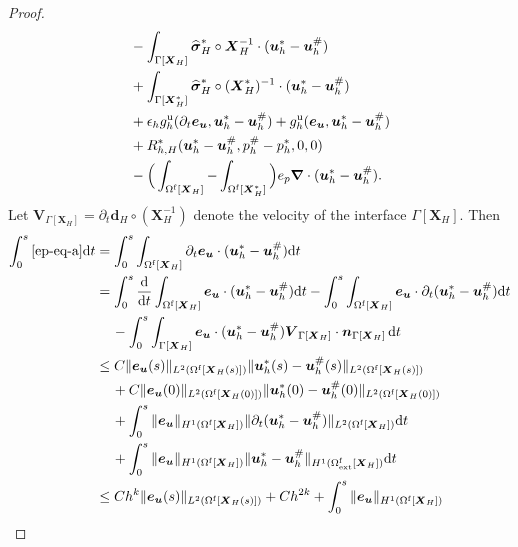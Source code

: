 \documentclass[11pt,reqno]{amsart}
\theoremstyle{definition}
\theoremstyle{plain}
\numberwithin{theorem}{section}
\numberwithin{proposition}{section}
\numberwithin{lemma}{section}
\numberwithin{equation}{section}
\newcommand{\bs}[1]{\boldsymbol{#1}}
\newcommand{\uu}[1]  {{\bs{#1}} }
\newcommand{\grad}   { \uu{\nabla}    }
\def\d{\mathrm{d}}
\renewcommand{\(}{\bigl(}
\renewcommand{\)}{\bigr)}
\begin{document}
\begin{proof}
\begin{subequations}
\begin{align}
& - \int_{\Gamma[\bs X_H]} {\widehat{\bs\sigma}}_H^*\circ {\bs X}_H^{-1}\cdot ({\bs u}_h^*-{\bs u}_h^\#)
\label{ep-eq-j}\\
& + \int_{\Gamma[\bs X_H^*]} {\widehat{\bs\sigma}}_H^*\circ({\bs X}_H^*)^{-1} \cdot ({\bs u}_h^*-{\bs u}_h^\#)  
\label{ep-eq-k}\\
& + \epsilon_h g_h^{\rm u} (\partial_t{\bs e}_{\bs u},{\bs u}_h^*-{\bs u}_h^\# )  + g_h^{\rm u} ({\bs e}_{\bs u},{\bs u}_h^*-{\bs u}_h^\# ) \label{ep-eq-l}\\
& + R_{h,H}^*( {\bs u}_h^*-{\bs u}_h^\# , p_h^\#- p_h^*, 0, 0)  \label{ep-eq-m}\\
& - \Big( \int_{\Omega^{\rm f}[\bs X_H]} - \int_{\Omega^{\rm f}[\bs X_H^*]} \Big) e_p \grad\cdot({\bs u}_h^*-{\bs u}_h^\#) . 
\label{ep-eq-n}
\end{align}
\end{subequations}
Let ${\bs V}_{\Gamma[\bs X_H]}=\partial_t{\bs d}_H\circ({\bs X}_H^{-1})$ denote the velocity of the interface $\Gamma[\bs X_H]$. Then 
\begin{align*}
\int_0^s \eqref{ep-eq-a} \d t
&= \int_0^s \int_{\Omega^{\rm f}[\bs X_H]} \partial_t {\bs e}_{\bs u} \cdot ({\bs u}_h^*-{\bs u}_h^\#) \d t \\
&= \int_0^s \frac{\d}{\d t}\int_{\Omega^{\rm f}[\bs X_H]}{\bs e}_{\bs u} \cdot ({\bs u}_h^*-{\bs u}_h^\#) \d t 
- \int_0^s \int_{\Omega^{\rm f}[\bs X_H]}{\bs e}_{\bs u} \cdot \partial_t({\bs u}_h^*-{\bs u}_h^\#) \d t \notag\\
&\quad\, 
- \int_0^s \int_{\Gamma[\bs X_H]}{\bs e}_{\bs u} \cdot ({\bs u}_h^*-{\bs u}_h^\#) {\bs V}_{\Gamma[\bs X_H]}\cdot {\bs n}_{\Gamma[\bs X_H]} \, \d t \\
&\le 
C\|{\bs e}_{\bs u}(s)\|_{L^2(\Omega^{\rm f}[\bs X_H(s)])} \| {\bs u}_h^*(s)-{\bs u}_h^\#(s)\|_{L^2(\Omega^{\rm f}[\bs X_H(s)])} \\
&\quad\, + C\|{\bs e}_{\bs u}(0)\|_{L^2(\Omega^{\rm f}[\bs X_H(0)])} \| {\bs u}_h^*(0)-{\bs u}_h^\#(0)\|_{L^2(\Omega^{\rm f}[\bs X_H(0)])} \\
&\quad\,
+ \int_0^s \|{\bs e}_{\bs u}\|_{H^1(\Omega^{\rm f}[\bs X_H])}
\|\partial_t({\bs u}_h^*-{\bs u}_h^\#)\|_{L^2(\Omega^{\rm f}[\bs X_H])} \d t \\
&\quad\,
+ \int_0^s \|{\bs e}_{\bs u}\|_{H^1(\Omega^{\rm f}[\bs X_H])}
\|{\bs u}_h^*-{\bs u}_h^\#\|_{H^1(\Omega^{\rm f}_{\rm ext}[\bs X_H])} \d t \\
&\le 
Ch^k\|{\bs e}_{\bs u}(s)\|_{L^2(\Omega^{\rm f}[\bs X_H(s)])} 
+ Ch^{2k}
+ \int_0^s \|{\bs e}_{\bs u}\|_{H^1(\Omega^{\rm f}[\bs X_H])}

\end{align*}
\end{proof}
\end{document}
